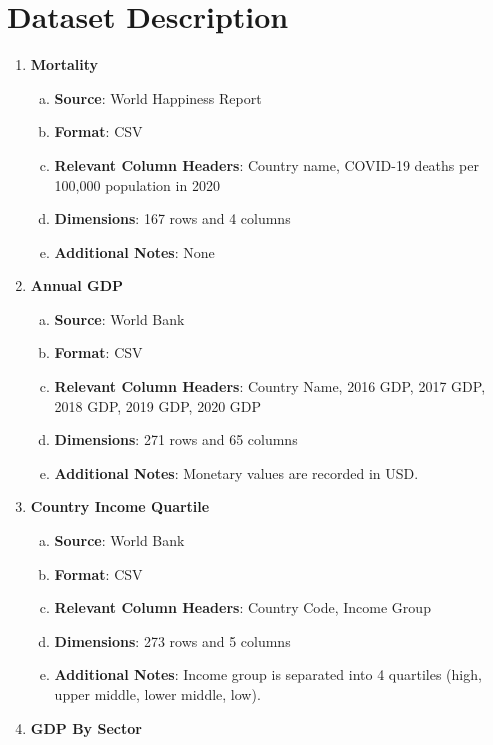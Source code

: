 \documentclass[fontsize=11pt]{article}
\begin{document}
\section*{Dataset Description}
\begin{enumerate}
    \item \textbf{Mortality}
        \begin{enumerate}[(a)]
            \item \textbf{Source}: World Happiness Report
            \item \textbf{Format}: CSV
            \item \textbf{Relevant Column Headers}: Country name, COVID-19 deaths per 100,000 population in 2020
            \item \textbf{Dimensions}: 167 rows and 4 columns
            \item \textbf{Additional Notes}: None
        \end{enumerate}
    \item \textbf{Annual GDP}
        \begin{enumerate}[(a)]
            \item \textbf{Source}: World Bank
            \item \textbf{Format}: CSV
            \item \textbf{Relevant Column Headers}: Country Name, 2016 GDP, 2017 GDP, 2018 GDP, 2019 GDP, 2020 GDP
            \item \textbf{Dimensions}: 271 rows and 65 columns
            \item \textbf{Additional Notes}: Monetary values are recorded in USD.
        \end{enumerate}
    \item \textbf{Country Income Quartile}
        \begin{enumerate}[(a)]
            \item \textbf{Source}: World Bank
            \item \textbf{Format}: CSV
            \item \textbf{Relevant Column Headers}: Country Code, Income Group
            \item \textbf{Dimensions}: 273 rows and 5 columns
            \item \textbf{Additional Notes}: Income group is separated into 4 quartiles (high, upper middle, lower middle, low).
        \end{enumerate}
    \item \textbf{GDP By Sector}
        \begin{enumerate}[(a)]

\end{enumerate}
\end{enumerate}
\end{document}
